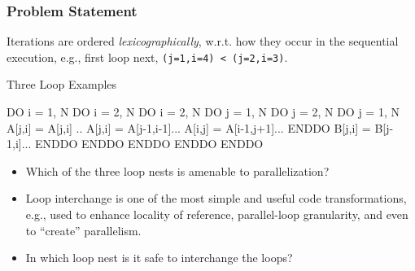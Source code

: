 \documentclass{beamer}
\begin{document}
\begin{frame}[fragile,t]
  \frametitle{Problem Statement} %

Iterations are ordered {\em lexicographically}, w.r.t. how they 
occur in the sequential execution, e.g., first loop next, 
{\tt(j=1,i=4) < (j=2,i=3)}.

\begin{block}{Three Loop Examples}
\begin{colorcode}
DO i = 1, N             DO i = 2, N                 DO i = 2, N
  DO j = 1, N             DO j = 2, N                 DO j = 1, N 
    A[j,i] = A[j,i] ..      A[j,i] = A[j-1,i-1]...        A[i,j] = A[i-1,j+1]...
  ENDDO                     B[j,i] = B[j-1,i]...      ENDDO
ENDDO                   ENDDO ENDDO                 ENDDO
\end{colorcode}
\end{block} 

\bigskip

\begin{itemize}
    \item Which of the three loop nests is amenable to parallelization?\smallskip
    \item Loop interchange is one of the most simple and useful code transformations,
            e.g., used to enhance locality of reference, parallel-loop granularity,
            and even to ``create'' parallelism.\smallskip
    \item In which loop nest is it safe to interchange the loops?
\end{itemize}


\end{frame}
\end{document}
